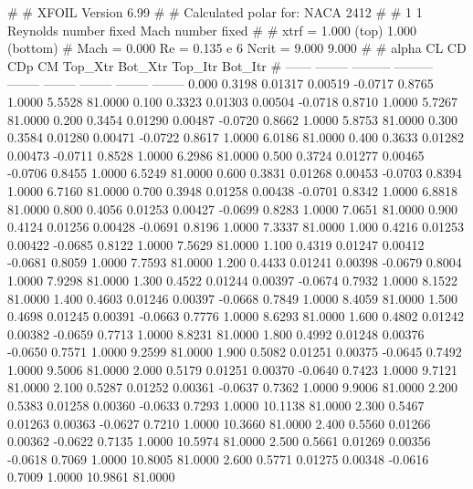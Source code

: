 #  
#       XFOIL         Version 6.99
#  
# Calculated polar for: NACA 2412                                       
#  
# 1 1 Reynolds number fixed          Mach number fixed         
#  
# xtrf =   1.000 (top)        1.000 (bottom)  
# Mach =   0.000     Re =     0.135 e 6     Ncrit =   9.000  9.000
#  
#   alpha    CL        CD       CDp       CM     Top_Xtr  Bot_Xtr  Top_Itr  Bot_Itr
#  ------ -------- --------- --------- -------- -------- -------- -------- --------
   0.000   0.3198   0.01317   0.00519  -0.0717   0.8765   1.0000   5.5528  81.0000
   0.100   0.3323   0.01303   0.00504  -0.0718   0.8710   1.0000   5.7267  81.0000
   0.200   0.3454   0.01290   0.00487  -0.0720   0.8662   1.0000   5.8753  81.0000
   0.300   0.3584   0.01280   0.00471  -0.0722   0.8617   1.0000   6.0186  81.0000
   0.400   0.3633   0.01282   0.00473  -0.0711   0.8528   1.0000   6.2986  81.0000
   0.500   0.3724   0.01277   0.00465  -0.0706   0.8455   1.0000   6.5249  81.0000
   0.600   0.3831   0.01268   0.00453  -0.0703   0.8394   1.0000   6.7160  81.0000
   0.700   0.3948   0.01258   0.00438  -0.0701   0.8342   1.0000   6.8818  81.0000
   0.800   0.4056   0.01253   0.00427  -0.0699   0.8283   1.0000   7.0651  81.0000
   0.900   0.4124   0.01256   0.00428  -0.0691   0.8196   1.0000   7.3337  81.0000
   1.000   0.4216   0.01253   0.00422  -0.0685   0.8122   1.0000   7.5629  81.0000
   1.100   0.4319   0.01247   0.00412  -0.0681   0.8059   1.0000   7.7593  81.0000
   1.200   0.4433   0.01241   0.00398  -0.0679   0.8004   1.0000   7.9298  81.0000
   1.300   0.4522   0.01244   0.00397  -0.0674   0.7932   1.0000   8.1522  81.0000
   1.400   0.4603   0.01246   0.00397  -0.0668   0.7849   1.0000   8.4059  81.0000
   1.500   0.4698   0.01245   0.00391  -0.0663   0.7776   1.0000   8.6293  81.0000
   1.600   0.4802   0.01242   0.00382  -0.0659   0.7713   1.0000   8.8231  81.0000
   1.800   0.4992   0.01248   0.00376  -0.0650   0.7571   1.0000   9.2599  81.0000
   1.900   0.5082   0.01251   0.00375  -0.0645   0.7492   1.0000   9.5006  81.0000
   2.000   0.5179   0.01251   0.00370  -0.0640   0.7423   1.0000   9.7121  81.0000
   2.100   0.5287   0.01252   0.00361  -0.0637   0.7362   1.0000   9.9006  81.0000
   2.200   0.5383   0.01258   0.00360  -0.0633   0.7293   1.0000  10.1138  81.0000
   2.300   0.5467   0.01263   0.00363  -0.0627   0.7210   1.0000  10.3660  81.0000
   2.400   0.5560   0.01266   0.00362  -0.0622   0.7135   1.0000  10.5974  81.0000
   2.500   0.5661   0.01269   0.00356  -0.0618   0.7069   1.0000  10.8005  81.0000
   2.600   0.5771   0.01275   0.00348  -0.0616   0.7009   1.0000  10.9861  81.0000
